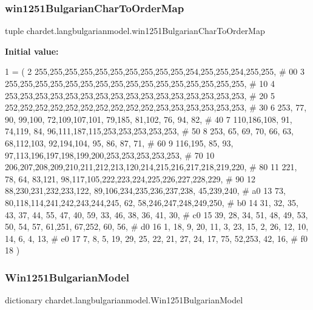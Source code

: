 \subsubsection{\texorpdfstring{win1251\+Bulgarian\+Char\+To\+Order\+Map}{win1251BulgarianCharToOrderMap}}
{\footnotesize\ttfamily tuple chardet.\+langbulgarianmodel.\+win1251\+Bulgarian\+Char\+To\+Order\+Map}

{\bfseries Initial value\+:}
\begin{DoxyCode}
1 =  (
2 255,255,255,255,255,255,255,255,255,255,254,255,255,254,255,255,  \textcolor{comment}{# 00}
3 255,255,255,255,255,255,255,255,255,255,255,255,255,255,255,255,  \textcolor{comment}{# 10}
4 253,253,253,253,253,253,253,253,253,253,253,253,253,253,253,253,  \textcolor{comment}{# 20}
5 252,252,252,252,252,252,252,252,252,252,253,253,253,253,253,253,  \textcolor{comment}{# 30}
6 253, 77, 90, 99,100, 72,109,107,101, 79,185, 81,102, 76, 94, 82,  \textcolor{comment}{# 40}
7 110,186,108, 91, 74,119, 84, 96,111,187,115,253,253,253,253,253,  \textcolor{comment}{# 50}
8 253, 65, 69, 70, 66, 63, 68,112,103, 92,194,104, 95, 86, 87, 71,  \textcolor{comment}{# 60}
9 116,195, 85, 93, 97,113,196,197,198,199,200,253,253,253,253,253,  \textcolor{comment}{# 70}
10 206,207,208,209,210,211,212,213,120,214,215,216,217,218,219,220,  \textcolor{comment}{# 80}
11 221, 78, 64, 83,121, 98,117,105,222,223,224,225,226,227,228,229,  \textcolor{comment}{# 90}
12  88,230,231,232,233,122, 89,106,234,235,236,237,238, 45,239,240,  \textcolor{comment}{# a0}
13  73, 80,118,114,241,242,243,244,245, 62, 58,246,247,248,249,250,  \textcolor{comment}{# b0}
14  31, 32, 35, 43, 37, 44, 55, 47, 40, 59, 33, 46, 38, 36, 41, 30,  \textcolor{comment}{# c0}
15  39, 28, 34, 51, 48, 49, 53, 50, 54, 57, 61,251, 67,252, 60, 56,  \textcolor{comment}{# d0}
16   1, 18,  9, 20, 11,  3, 23, 15,  2, 26, 12, 10, 14,  6,  4, 13,  \textcolor{comment}{# e0}
17   7,  8,  5, 19, 29, 25, 22, 21, 27, 24, 17, 75, 52,253, 42, 16,  \textcolor{comment}{# f0}
18 )
\end{DoxyCode}
\mbox{\label{namespacechardet_1_1langbulgarianmodel_a7901e504e5bb13f0fea9c63eac11dc03}} 
\subsubsection{\texorpdfstring{Win1251\+Bulgarian\+Model}{Win1251BulgarianModel}}
{\footnotesize\ttfamily dictionary chardet.\+langbulgarianmodel.\+Win1251\+Bulgarian\+Model}

